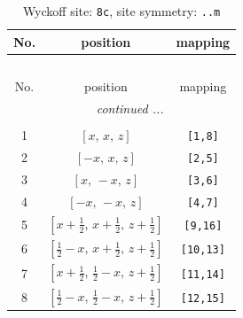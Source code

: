 \documentclass[fleqn,8pt]{jsarticle}
\begin{document}
\renewcommand{\arraystretch}{1.2}
\begin{longtable}{ccc}
\caption{Wyckoff site: {\tt 8c}, site symmetry: {\tt ..m}}
 \\
 \hline \hline
No. & position & mapping \\ \hline \endfirsthead

\multicolumn{2}{l}{\tablename\ \thetable{}} \\
 \hline \hline
No. & position & mapping \\ \hline \endhead

 \hline \hline
\multicolumn{2}{r}{\footnotesize\it continued ...} \\ \endfoot

 \hline \hline
\multicolumn{2}{r}{} \\ \endlastfoot

1 & $\left[ x,\, x,\, z \right]$ & {\tt [1,8]} \\ \hline
2 & $\left[ - x,\, x,\, z \right]$ & {\tt [2,5]} \\ \hline
3 & $\left[ x,\, - x,\, z \right]$ & {\tt [3,6]} \\ \hline
4 & $\left[ - x,\, - x,\, z \right]$ & {\tt [4,7]} \\ \hline
5 & $\left[ x + \frac{1}{2},\, x + \frac{1}{2},\, z + \frac{1}{2} \right]$ & {\tt [9,16]} \\ \hline
6 & $\left[ \frac{1}{2} - x,\, x + \frac{1}{2},\, z + \frac{1}{2} \right]$ & {\tt [10,13]} \\ \hline
7 & $\left[ x + \frac{1}{2},\, \frac{1}{2} - x,\, z + \frac{1}{2} \right]$ & {\tt [11,14]} \\ \hline
8 & $\left[ \frac{1}{2} - x,\, \frac{1}{2} - x,\, z + \frac{1}{2} \right]$ & {\tt [12,15]} \\
\end{longtable}
\renewcommand{\arraystretch}{1.2}
\end{document}
